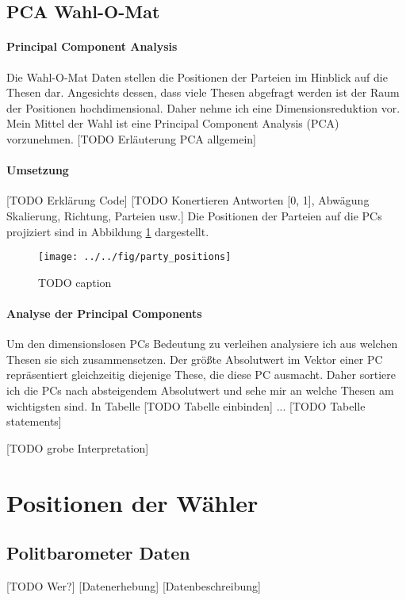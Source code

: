 \subsection{PCA Wahl-O-Mat}
\paragraph{Principal Component Analysis}
Die Wahl-O-Mat Daten stellen die Positionen der Parteien im Hinblick auf die Thesen dar. Angesichts dessen, dass viele Thesen abgefragt werden ist der Raum der Positionen hochdimensional. Daher nehme ich eine Dimensionsreduktion vor. Mein Mittel der Wahl ist eine Principal Component Analysis (PCA) vorzunehmen.
[TODO Erläuterung PCA allgemein]

\paragraph{Umsetzung}
[TODO Erklärung Code]
[TODO Konertieren Antworten [0, 1], Abwägung Skalierung, Richtung, Parteien usw.]
Die Positionen der Parteien auf die PCs projiziert sind in Abbildung \ref{fig:party-positions-pca} dargestellt.

\begin{figure}[htb]
	\centering
	\texttt{[image: ../../fig/party\_positions]}
	\caption{TODO caption}
	\label{fig:party-positions-pca}
\end{figure}

\paragraph{Analyse der Principal Components}
Um den dimensionslosen PCs Bedeutung zu verleihen analysiere ich aus welchen Thesen sie sich zusammensetzen. Der größte Absolutwert im Vektor einer PC repräsentiert gleichzeitig diejenige These, die diese PC ausmacht. Daher sortiere ich die PCs nach absteigendem Absolutwert und sehe mir an welche Thesen am wichtigsten sind. In Tabelle [TODO Tabelle einbinden] ...
[TODO Tabelle statements]

[TODO grobe Interpretation]

\section{Positionen der Wähler}\label{Sec-Wählerpositionen}

\subsection{Politbarometer Daten}
[TODO Wer?]
[Datenerhebung]
[Datenbeschreibung]

